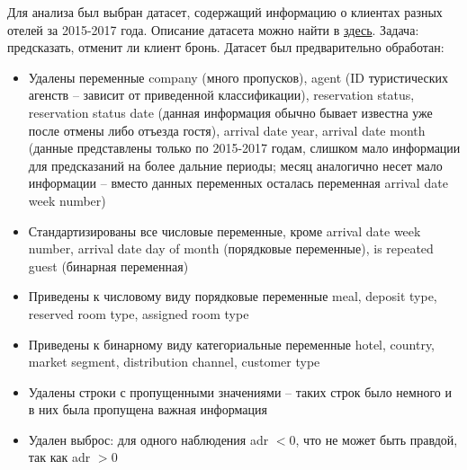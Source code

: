 Для анализа был выбран датасет, содержащий информацию о клиентах разных отелей за 2015-2017 года. Описание датасета можно найти в \href{https://www.kaggle.com/jessemostipak/hotel-booking-demand}{здесь}. Задача: предсказать, отменит ли клиент бронь. Датасет был предварительно обработан:
\begin{itemize}
	\item Удалены переменные company (много пропусков), agent (ID туристических агенств -- зависит от приведенной классификации), reservation status, reservation status date (данная информация обычно бывает известна уже после отмены либо отъезда гостя), arrival date year, arrival date month (данные представлены только по 2015-2017 годам, слишком мало информации для предсказаний на более дальние периоды; месяц аналогично несет мало информации -- вместо данных переменных осталась переменная arrival date week number)
	\item Стандартизированы все числовые переменные, кроме arrival date week number, arrival date day of month (порядковые переменные), is repeated guest (бинарная переменная)
	\item Приведены к числовому виду порядковые переменные meal, deposit type, reserved room type, assigned room type
	\item Приведены к бинарному виду категориальные переменные hotel, country, market segment, distribution channel, customer type
	\item Удалены строки с пропущенными значениями -- таких строк было немного и в них была пропущена важная информация
	\item Удален выброс: для одного наблюдения adr $<0$, что не может быть правдой, так как adr $> 0$
\end{itemize}